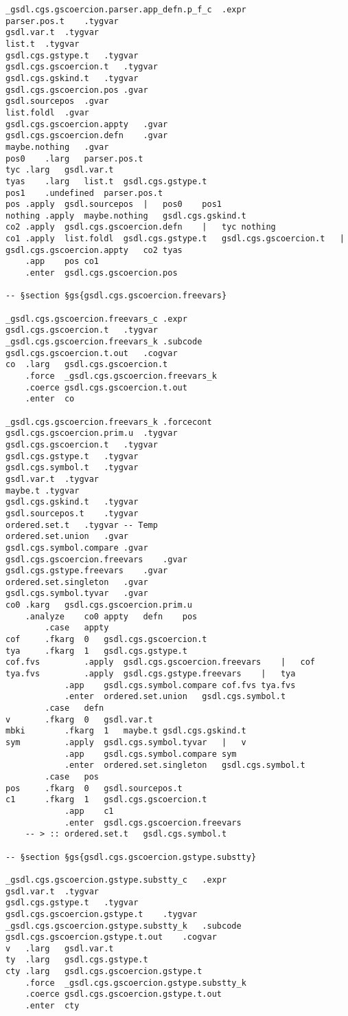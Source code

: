 \documentclass{report}
\begin{document}
\begin{verbatim}
_gsdl.cgs.gscoercion.parser.app_defn.p_f_c	.expr
parser.pos.t	.tygvar
gsdl.var.t	.tygvar
list.t	.tygvar
gsdl.cgs.gstype.t	.tygvar
gsdl.cgs.gscoercion.t	.tygvar
gsdl.cgs.gskind.t	.tygvar
gsdl.cgs.gscoercion.pos	.gvar
gsdl.sourcepos	.gvar
list.foldl	.gvar
gsdl.cgs.gscoercion.appty	.gvar
gsdl.cgs.gscoercion.defn	.gvar
maybe.nothing	.gvar
pos0	.larg	parser.pos.t
tyc	.larg	gsdl.var.t
tyas	.larg	list.t	gsdl.cgs.gstype.t
pos1	.undefined	parser.pos.t
pos	.apply	gsdl.sourcepos	|	pos0	pos1
nothing	.apply	maybe.nothing	gsdl.cgs.gskind.t
co2	.apply	gsdl.cgs.gscoercion.defn	|	tyc	nothing
co1	.apply	list.foldl	gsdl.cgs.gstype.t	gsdl.cgs.gscoercion.t	|	gsdl.cgs.gscoercion.appty	co2	tyas
	.app	pos	co1
	.enter	gsdl.cgs.gscoercion.pos

-- §section §gs{gsdl.cgs.gscoercion.freevars}

_gsdl.cgs.gscoercion.freevars_c	.expr
gsdl.cgs.gscoercion.t	.tygvar
_gsdl.cgs.gscoercion.freevars_k	.subcode
gsdl.cgs.gscoercion.t.out	.cogvar
co	.larg	gsdl.cgs.gscoercion.t
	.force	_gsdl.cgs.gscoercion.freevars_k
	.coerce	gsdl.cgs.gscoercion.t.out
	.enter	co

_gsdl.cgs.gscoercion.freevars_k	.forcecont
gsdl.cgs.gscoercion.prim.u	.tygvar
gsdl.cgs.gscoercion.t	.tygvar
gsdl.cgs.gstype.t	.tygvar
gsdl.cgs.symbol.t	.tygvar
gsdl.var.t	.tygvar
maybe.t	.tygvar
gsdl.cgs.gskind.t	.tygvar
gsdl.sourcepos.t	.tygvar
ordered.set.t	.tygvar	-- Temp
ordered.set.union	.gvar
gsdl.cgs.symbol.compare	.gvar
gsdl.cgs.gscoercion.freevars	.gvar
gsdl.cgs.gstype.freevars	.gvar
ordered.set.singleton	.gvar
gsdl.cgs.symbol.tyvar	.gvar
co0	.karg	gsdl.cgs.gscoercion.prim.u
	.analyze	co0	appty	defn	pos
		.case	appty
cof		.fkarg	0	gsdl.cgs.gscoercion.t
tya		.fkarg	1	gsdl.cgs.gstype.t
cof.fvs			.apply	gsdl.cgs.gscoercion.freevars	|	cof
tya.fvs			.apply	gsdl.cgs.gstype.freevars	|	tya
			.app	gsdl.cgs.symbol.compare	cof.fvs	tya.fvs
			.enter	ordered.set.union	gsdl.cgs.symbol.t
		.case	defn
v		.fkarg	0	gsdl.var.t
mbki		.fkarg	1	maybe.t	gsdl.cgs.gskind.t
sym			.apply	gsdl.cgs.symbol.tyvar	|	v
			.app	gsdl.cgs.symbol.compare	sym
			.enter	ordered.set.singleton	gsdl.cgs.symbol.t
		.case	pos
pos		.fkarg	0	gsdl.sourcepos.t
c1		.fkarg	1	gsdl.cgs.gscoercion.t
			.app	c1
			.enter	gsdl.cgs.gscoercion.freevars
	-- > :: ordered.set.t	gsdl.cgs.symbol.t

-- §section §gs{gsdl.cgs.gscoercion.gstype.substty}

_gsdl.cgs.gscoercion.gstype.substty_c	.expr
gsdl.var.t	.tygvar
gsdl.cgs.gstype.t	.tygvar
gsdl.cgs.gscoercion.gstype.t	.tygvar
_gsdl.cgs.gscoercion.gstype.substty_k	.subcode
gsdl.cgs.gscoercion.gstype.t.out	.cogvar
v	.larg	gsdl.var.t
ty	.larg	gsdl.cgs.gstype.t
cty	.larg	gsdl.cgs.gscoercion.gstype.t
	.force	_gsdl.cgs.gscoercion.gstype.substty_k
	.coerce	gsdl.cgs.gscoercion.gstype.t.out
	.enter	cty


\end{verbatim}
\end{document}
